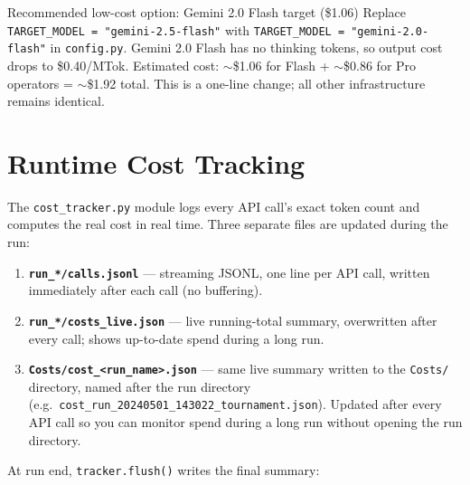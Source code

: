 \documentclass[11pt,a4paper]{report}
\begin{document}
\begin{savingbox}{Recommended low-cost option: Gemini 2.0 Flash target (\$1.06)}
Replace \texttt{TARGET\_MODEL = "gemini-2.5-flash"} with
\texttt{TARGET\_MODEL = "gemini-2.0-flash"} in \texttt{config.py}.
Gemini 2.0 Flash has no thinking tokens, so output cost drops to \$0.40/MTok.
Estimated cost: $\sim$\$1.06 for Flash + $\sim$\$0.86 for Pro operators = $\sim$\$1.92 total.
This is a one-line change; all other infrastructure remains identical.
\end{savingbox}


\chapter{Runtime Cost Tracking}

The \texttt{cost\_tracker.py} module logs every API call's exact token count and
computes the real cost in real time.  Three separate files are updated during the run:

\begin{enumerate}[nosep]
  \item \textbf{\texttt{run\_*/calls.jsonl}} --- streaming JSONL, one line per API call,
        written immediately after each call (no buffering).
  \item \textbf{\texttt{run\_*/costs\_live.json}} --- live running-total summary, overwritten
        after every call; shows up-to-date spend during a long run.
  \item \textbf{\texttt{Costs/cost\_\textless run\_name\textgreater.json}} --- same live summary written to the
        \texttt{Costs/} directory, named after the run directory (e.g.\
        \texttt{cost\_run\_20240501\_143022\_tournament.json}).
        Updated after every API call so you can monitor spend during a long run
        without opening the run directory.
\end{enumerate}

At run end, \texttt{tracker.flush()} writes the final summary:
\end{document}
